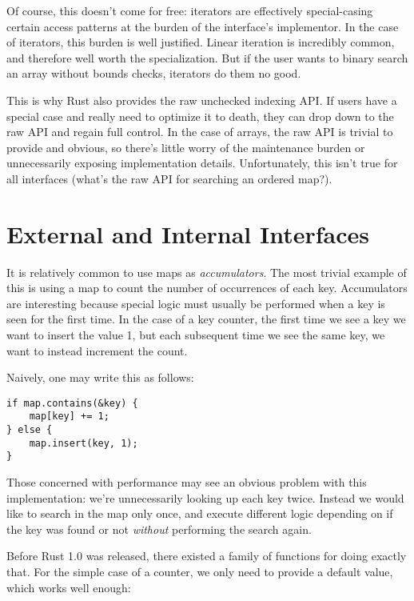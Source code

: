 Of course, this doesn't come for free: iterators are effectively special-casing
certain access patterns at the burden of the interface's implementor. In the
case of iterators, this burden is well justified. Linear iteration
is incredibly common, and therefore well worth the specialization. But if the
user wants to binary search an array without bounds checks, iterators do them no
good.

This is why Rust also provides the raw unchecked indexing API. If users have a
special case and really need to optimize it to death, they can drop down to
the raw API and regain full control. In the case of arrays, the raw API is
trivial to provide and obvious, so there's little worry of the maintenance burden
or unnecessarily exposing implementation details. Unfortunately, this isn't true for all
interfaces (what's the raw API for searching an ordered map?).






\section{External and Internal Interfaces}

It is relatively common to use maps as \emph{accumulators}. The most trivial example
of this is using a map to count the number of occurrences of each key. Accumulators
are interesting because special logic must usually be performed when a key is
seen for the first time. In the case of a key counter, the first time we see a key
we want to insert the value 1, but each subsequent time we see the same key,
we want to instead increment the count.

Naively, one may write this as follows:

\begin{verbatim}
if map.contains(&key) {
    map[key] += 1;
} else {
    map.insert(key, 1);
}
\end{verbatim}

Those concerned with performance may see an obvious problem with this implementation:
we're unnecessarily looking up each key twice. Instead we would like to search in the
map only once, and execute different logic depending on if the key was found or not
\emph{without} performing the search again.

Before Rust 1.0 was released, there existed a family of functions for doing exactly
that. For the simple case of a counter, we only need to provide a default value,
which works well enough:

